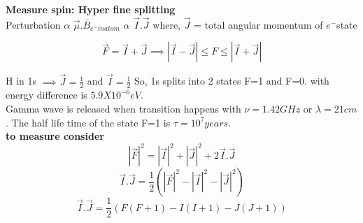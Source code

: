 \textbf{Measure spin: Hyper fine splitting}\\
Perturbation $\alpha$ \(\vec{\mu}.\bar{B}_{e^- in atom}\) $\alpha$ \(\vec{I}.\vec{J}\) where, \(\vec{J}\) = total angular momentum of $e^- $state
\begin{definition}
    \[
        \vec{F} = \vec{I}+ \vec{J} \implies 
        \left\vert \vec{I}- \vec{J} \right\vert \leq F \leq \left\vert \vec{I}+ \vec{J} \right\vert 
    \]
\end{definition}

H in 1s \(\implies \vec{J} = \frac{1}{2}\) and \(\vec{I} = \frac{1}{2}\)
So, 1s splits into 2 states F=1 and F=0. with energy difference is $5.9 X 10^{-6} eV. $\\
Gamma wave is released when transition happens with \(\nu = 1.42 GHz\) or \(\lambda = 21cm\). The half life time of the state F=1 is \(\tau = 10^7 years\). \\
\textbf{to measure consider}  
\[
    \left\vert \vec{F} \right\vert^2 = \left\vert \vec{I} \right\vert^2 + \left\vert \vec{J} \right\vert^2 + 2\vec{I}.\vec{J}
\]
\[
    \vec{I}.\vec{J} = \frac{1}{2} (\left\vert \vec{F} \right\vert^2 -\left\vert \vec{I} \right\vert^2 - \left\vert \vec{J} \right\vert^2 )
\]
\[
    \vec{I}.\vec{J} = \frac{1}{2}(F(F+1)-I(I+1)-J(J+1))
\]
\[

\]